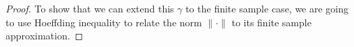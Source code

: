 \begin{proof}


To show that we can extend this $\gamma$ to the finite sample case, we are going to use Hoeffding inequality to relate the norm $\|\cdot\|$ to its finite sample approximation. 


\end{proof}
